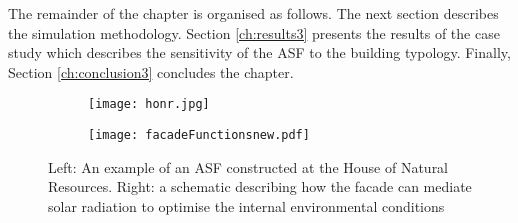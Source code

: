 The remainder of the chapter is organised as follows. The next section describes the simulation methodology. Section \ref{ch:results3} presents the results of the case study which describes the sensitivity of the ASF to the building typology. Finally, Section \ref{ch:conclusion3} concludes the chapter.

\begin{figure}
    \centering
    \begin{subfigure}[b]{0.47\textwidth}
        \texttt{[image: honr.jpg]}
		\label{fig:HoNR}
    \end{subfigure} \hfill
    \begin{subfigure}[b]{0.47\textwidth}
        \texttt{[image: facadeFunctionsnew.pdf]}
		\label{fig:ASFschematic3}
    \end{subfigure}
    \caption{Left: An example of an ASF constructed at the House of Natural Resources. Right: a schematic describing how the facade can mediate solar radiation to optimise the internal environmental conditions \cite{nagy2016adaptive}}
    \label{fig:introduction3}
\end{figure}









